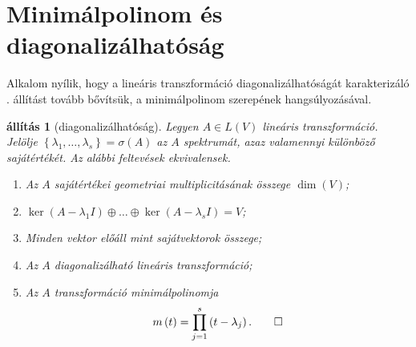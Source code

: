 \documentclass[a4paper, showtrims]{memoir}
\theoremstyle{plain}
\newtheorem{proposition}{állítás}[chapter]
\theoremstyle{remark}
\theoremstyle{definition}
\begin{document}
\section{Minimálpolinom és diagonalizálhatóság}
Alkalom nyílik,
hogy a lineáris transzformáció diagonalizálhatóságát karakterizáló . állítást
tovább bővítsük, a minimálpolinom szerepének hangsúlyozásával.
\begin{proposition}[diagonalizálhatóság]\label{pr:diagonalizalhatosag}
	Legyen $A\in L\left( V \right)$ lineáris transzformáció.
	Jelölje $\left\{ \lambda_1,\ldots,\lambda_s \right\}=\sigma\left( A \right)$
	az $A$ spektrumát,
	azaz valamennyi különböző sajátértékét.
	Az alábbi feltevések ekvivalensek.
	\begin{enumerate}
		\item Az $A$ sajátértékei geometriai multiplicitásának összege $\dim(V)$;
		\item
		      \begin{math}
			      \ker\left( A-\lambda_1 I \right)\oplus\dots\oplus\ker\left( A-\lambda_s I \right)=V
		      \end{math};
		\item Minden vektor előáll mint sajátvektorok összege;
		\item Az $A$ diagonalizálható lineáris transzformáció;
		\item Az $A$ transzformáció minimálpolinomja
		      \[
			      m\left( t \right)=
			      \prod_{j=1}^s\left( t-\lambda_j \right).
			      \qedhere
		      \]
	\end{enumerate}
\end{proposition}
\end{document}
